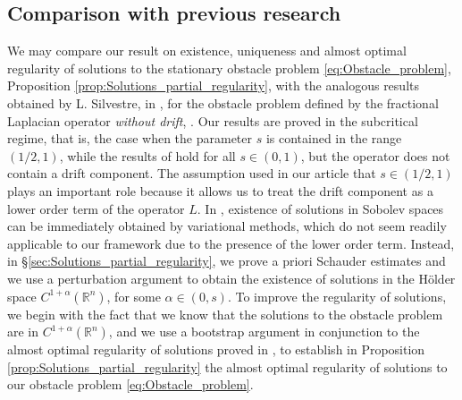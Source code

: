 \documentclass[11pt,reqno]{amsart}
\theoremstyle{definition}
\theoremstyle{remark}
\begin{document}
\subsection{Comparison with previous research}
\label{subsec:Previous_research}
We may compare our result on existence, uniqueness and almost optimal regularity of solutions to the stationary obstacle problem \eqref{eq:Obstacle_problem}, Proposition \ref{prop:Solutions_partial_regularity}, with the analogous results obtained by L. Silvestre, in \cite{Silvestre_2007}, for the obstacle problem defined by the fractional Laplacian operator \emph{without drift}, \cite[Complementarity conditions (1.1) and (1.2)]{Silvestre_2007}. Our results are proved in the subcritical regime, that is, the case when the parameter $s$ is contained in the range $(1/2,1)$, while the results of \cite{Silvestre_2007} hold for all $s\in (0,1)$, but the operator does not contain a drift component. The assumption used in our article that $s\in (1/2,1)$ plays an important role because it allows us to treat the drift component as a lower order term of the operator $L$. In \cite[\S 1.1]{Silvestre_2007}, existence of solutions in Sobolev spaces can be immediately obtained by variational methods, which do not seem readily applicable to our framework due to the presence of the lower order term. Instead, in \S \ref{sec:Solutions_partial_regularity}, we prove a priori Schauder estimates and we use a perturbation argument to obtain the existence of solutions in the H\"older space $C^{1+\alpha}({\mathbb{R}}^n)$, for some $\alpha\in (0,s)$. To improve the regularity of solutions, we begin with the fact that we know that the solutions to the obstacle problem are in $C^{1+\alpha}({\mathbb{R}}^n)$, and we use a bootstrap argument in conjunction to the almost optimal regularity of solutions proved in \cite[Theorem 5.8]{Silvestre_2007}, to establish  in Proposition \ref{prop:Solutions_partial_regularity} the almost optimal regularity of solutions to our obstacle problem \eqref{eq:Obstacle_problem}. 
\end{document}
